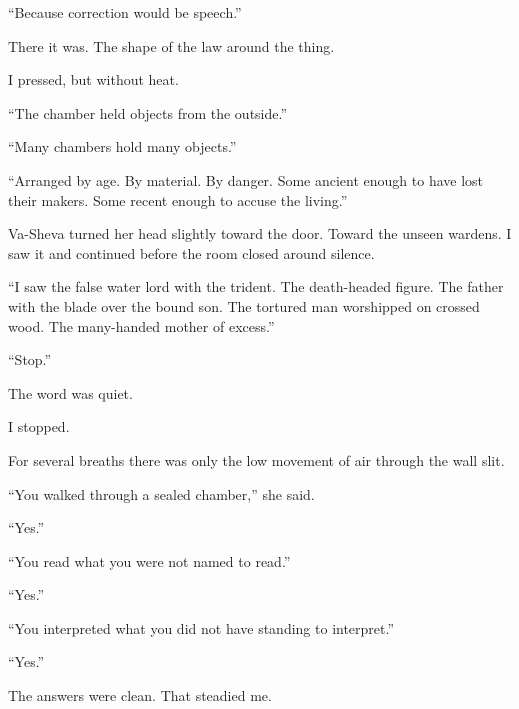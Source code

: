 ``Because correction would be speech.''\par

There it was. The shape of the law around the thing.\par

I pressed, but without heat.\par

``The chamber held objects from the outside.''\par

``Many chambers hold many objects.''\par

``Arranged by age. By material. By danger. Some ancient enough to have lost their makers. Some recent enough to accuse the living.''\par

Va-Sheva turned her head slightly toward the door. Toward the unseen wardens. I saw it and continued before the room closed around silence.\par

``I saw the false water lord with the trident. The death-headed figure. The father with the blade over the bound son. The tortured man worshipped on crossed wood. The many-handed mother of excess.''\par

``Stop.''\par

The word was quiet.\par

I stopped.\par

For several breaths there was only the low movement of air through the wall slit.\par

``You walked through a sealed chamber,'' she said.\par

``Yes.''\par

``You read what you were not named to read.''\par

``Yes.''\par

``You interpreted what you did not have standing to interpret.''\par

``Yes.''\par

The answers were clean. That steadied me.\par

